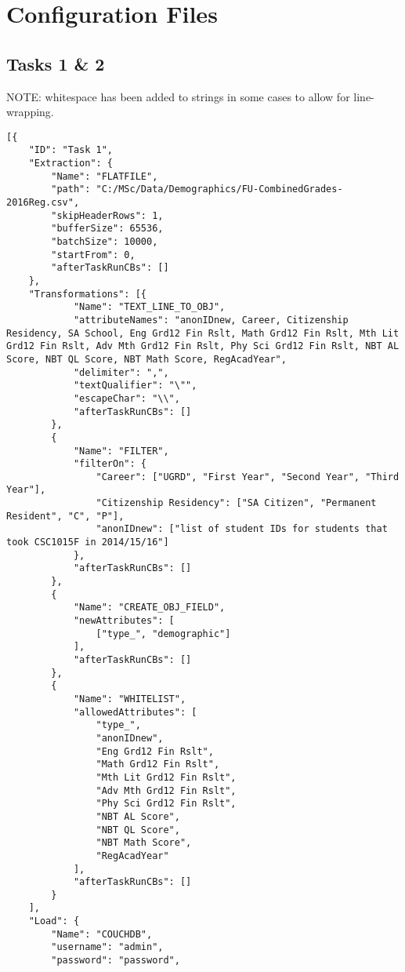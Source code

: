 \section{Configuration Files}
\label{netl-configuration}

\subsection{Tasks 1 \& 2}
\label{netl-tasks-1-2-config}
NOTE: whitespace has been added to strings in some cases to allow for line-wrapping.
\begin{verbatim}
[{
    "ID": "Task 1",
    "Extraction": {
        "Name": "FLATFILE",
        "path": "C:/MSc/Data/Demographics/FU-CombinedGrades-2016Reg.csv",
        "skipHeaderRows": 1,
        "bufferSize": 65536,
        "batchSize": 10000,
        "startFrom": 0,
        "afterTaskRunCBs": []
    },
    "Transformations": [{
            "Name": "TEXT_LINE_TO_OBJ",
            "attributeNames": "anonIDnew, Career, Citizenship Residency, SA School, Eng Grd12 Fin Rslt, Math Grd12 Fin Rslt, Mth Lit Grd12 Fin Rslt, Adv Mth Grd12 Fin Rslt, Phy Sci Grd12 Fin Rslt, NBT AL Score, NBT QL Score, NBT Math Score, RegAcadYear",
            "delimiter": ",",
            "textQualifier": "\"",
            "escapeChar": "\\",
            "afterTaskRunCBs": []
        },
        {
            "Name": "FILTER",
            "filterOn": {
                "Career": ["UGRD", "First Year", "Second Year", "Third Year"],
                "Citizenship Residency": ["SA Citizen", "Permanent Resident", "C", "P"],
                "anonIDnew": ["list of student IDs for students that took CSC1015F in 2014/15/16"]
            },
            "afterTaskRunCBs": []
        },
        {
            "Name": "CREATE_OBJ_FIELD",
            "newAttributes": [
                ["type_", "demographic"]
            ],
            "afterTaskRunCBs": []
        },
        {
            "Name": "WHITELIST",
            "allowedAttributes": [
                "type_",
                "anonIDnew",
                "Eng Grd12 Fin Rslt",
                "Math Grd12 Fin Rslt",
                "Mth Lit Grd12 Fin Rslt",
                "Adv Mth Grd12 Fin Rslt",
                "Phy Sci Grd12 Fin Rslt",
                "NBT AL Score",
                "NBT QL Score",
                "NBT Math Score",
                "RegAcadYear"
            ],
            "afterTaskRunCBs": []
        }
    ],
    "Load": {
        "Name": "COUCHDB",
        "username": "admin",
        "password": "password",

\end{verbatim}
